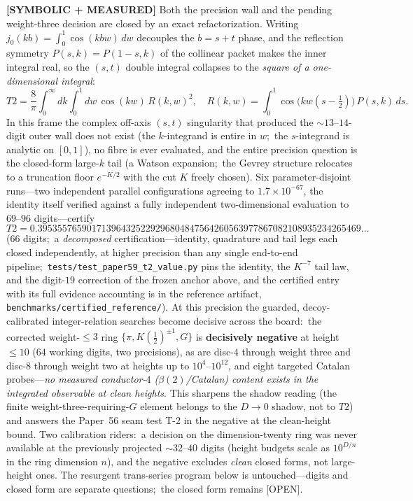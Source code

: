 \documentclass[aps,pra,twocolumn,superscriptaddress,longbibliography]{revtex4-2}
\newcommand{\gvq}[2]{#2}
\begin{document}
\textbf{[SYMBOLIC + MEASURED]} Both the precision wall and the pending
weight-three decision are closed by an exact refactorization.  Writing
$j_{0}(kb)=\int_{0}^{1}\cos(kbw)\,dw$ decouples the $b=s+t$ phase, and the
reflection symmetry $P(s,k)=P(1-s,k)$ of the collinear packet makes the inner
integral real, so the $(s,t)$ double integral collapses to the \emph{square of a
one-dimensional integral}:
\begin{equation}
T2=\frac{8}{\pi}\int_{0}^{\infty}\!\!dk\int_{0}^{1}\!\!dw\,\cos(kw)\,R(k,w)^{2},
\quad
R(k,w)=\int_{0}^{1}\!\cos\big(kw(s-\tfrac12)\big)\,P(s,k)\,ds.
\label{eq:kw}
\end{equation}
In this frame the complex off-axis $(s,t)$ singularity that produced the
$\sim\!13$--$14$-digit outer wall does not exist (the $k$-integrand is entire in
$w$;\ the $s$-integrand is analytic on $[0,1]$), no fibre is ever evaluated, and
the entire precision question is the closed-form large-$k$ tail (a Watson
expansion;\ the Gevrey structure relocates to a truncation floor $e^{-K/2}$ with
the cut $K$ freely chosen).  Six parameter-disjoint runs---two independent
parallel configurations agreeing to $1.7\times10^{-67}$, the identity itself
verified against a fully independent two-dimensional evaluation to $69$--$96$
digits---certify
\[
T2=\gvq{t2_collinear_period}{0.395355765901713964325229296804847564260563977867082108935234265469}\ldots
\]
($66$ digits;\ a \emph{decomposed} certification---identity, quadrature and tail legs
each closed independently, at higher precision than any single end-to-end pipeline;\
\texttt{tests/test\_paper59\_t2\_value.py} pins the identity, the $K^{-7}$ tail law, and the
digit-$19$ correction of the frozen anchor above, and the certified entry with its full
evidence accounting is in the reference artifact,
\texttt{benchmarks/certified\_reference/}).
At this precision the guarded, decoy-calibrated integer-relation searches become
decisive across the board:\ the corrected weight-$\le3$ ring
$\{\pi,K(\tfrac12)^{\pm1},G\}$ is \textbf{decisively negative} at height
$\le10$ ($64$ working digits, two precisions), as are disc-$4$ through weight
three and disc-$8$ through weight two at heights up to $10^{4}$--$10^{12}$, and
eight targeted Catalan probes---\emph{no measured conductor-$4$
($\beta(2)$/Catalan) content exists in the integrated observable at clean
heights}.  This sharpens the shadow reading (the finite
weight-three-requiring-$G$ element belongs to the $D\to0$ shadow, not to $T2$)
and answers the Paper~56 seam test T-2 in the negative at the clean-height
bound.  Two calibration riders:\ a decision on the dimension-twenty ring was
never available at the previously projected $\sim\!32$--$40$ digits (height
budgets scale as $10^{D/n}$ in the ring dimension $n$), and the negative
excludes \emph{clean} closed forms, not large-height ones.  The resurgent
trans-series program below is untouched---digits and closed form are separate
questions;\ the closed form remains [OPEN].
\end{document}
